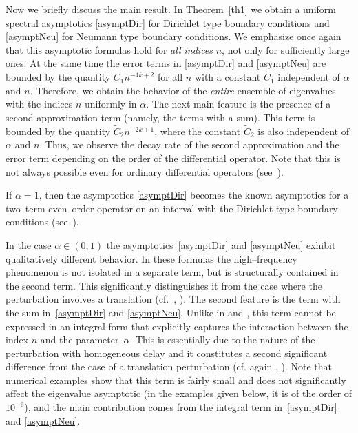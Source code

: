 \documentclass[11pt,centertags,reqno,twoside]{amsart}
\numberwithin{equation}{section}
\theoremstyle{definition}
\theoremstyle{remark}
\begin{document}
Now we briefly discuss the main result. In Theorem~\ref{th1} we obtain a uniform
spectral asymptotics \eqref{asymptDir} for Dirichlet type boundary conditions
and \eqref{asymptNeu} for Neumann type boundary conditions. We emphasize once again that
this asymptotic formulas hold for \textit{all indices} $n$, not only for sufficiently large ones.
At the same time the error terms in \eqref{asymptDir} and \eqref{asymptNeu}
are bounded by the quantity $\widetilde{C}_1n^{-4k+2}$ for all $n$ with a constant
$\widetilde{C}_1$ independent of $\alpha$ and $n$. Therefore, we obtain the behavior of the
\textit{entire} ensemble of eigenvalues with the indices $n$ uniformly in $\alpha$.
The next main feature is the presence of a second approximation
term (namely, the terms with a sum). This term is bounded by the quantity
$\widetilde{C}_2n^{-2k+1}$, where the constant $\widetilde{C}_2$ is also
independent of $\alpha$ and $n$. Thus, we observe the decay rate of
the second approximation and the error term depending on the order of the differential
operator. Note that this is not always possible even for ordinary differential
operators (see~\cite{Akhmerova}).

If $\alpha=1$, then the asymptotics \eqref{asymptDir} becomes the known asymptotics
for a two--term even--order operator on an interval with the Dirichlet type
boundary conditions (see~\cite{PolyakovM2AS}).

In the case $\alpha\in (0, 1)$ the asymptotics~\eqref{asymptDir} and \eqref{asymptNeu}
exhibit qualitatively different behavior. In these formulas the high--frequency
phenomenon is not isolated in a separate term, but is structurally contained in
the second term. This significantly distinguishes it from the case where
the perturbation involves a translation (cf.~\cite{BorPolIzv}, \cite{BorPolM2AS}).
The second feature is the term with the sum in~\eqref{asymptDir} and \eqref{asymptNeu}.
Unlike in \cite{BorPolIzv} and \cite{PolyakovM2AS}, this term cannot be expressed
in an integral form that explicitly captures the interaction between the index $n$ and the
parameter~$\alpha$. This is essentially due to the nature of the perturbation
with homogeneous delay and it constitutes a second significant difference from the
case of a translation perturbation (cf. again \cite{BorPolIzv}, \cite{BorPolM2AS}).
Note that numerical examples show that this term
is fairly small and does not significantly affect the eigenvalue asymptotic
(in the examples given below, it is of the order of $10^{-6}$), and
the main contribution comes from the integral term in~\eqref{asymptDir}
and \eqref{asymptNeu}.
\end{document}
